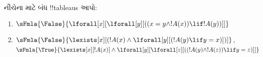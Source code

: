 \documentclass[../../../include/open-logic-section]{subfiles}
\begin{document}
\begin{prob}
નીચેના માટે બંધ !!{tableau}s આપો:
\begin{enumerate}
\item $\sFmla{\False}{\lforall[x][\lforall[y][((x = y \land !A(x))
      \lif !A(y))]]}$
\item $\sFmla{\False}{\lexists[x][(!A(x) \land
    \lforall[y][(!A(y) \lif y = x)])]}$,\\
  $\sFmla{\True}{\lexists[x][!A(x)] \land
    \lforall[y][\lforall[z][((!A(y) \land !A(z)) \lif y = z)]]}$
\end{enumerate}
\end{prob}
\end{document}
